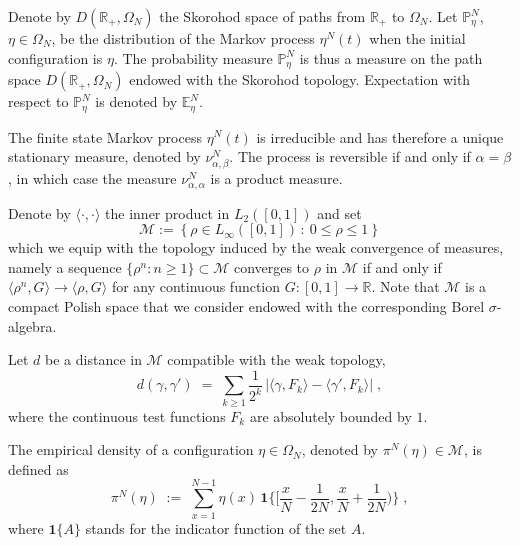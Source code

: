 \documentclass[reqno]{amsart}
\begin{document}
Denote by $D({{\mathbb R}}_+, \Omega_N)$ the Skorohod space of paths from ${{\mathbb R}}_+$ to $\Omega_N$.  Let ${{\mathbb P}}^N_\eta$, $\eta\in\Omega_N$, be the
distribution of the Markov process $\eta^N(t)$ when the initial
configuration is $\eta$. The probability measure ${{\mathbb P}}^N_\eta$ is
thus a measure on the path space $D({{\mathbb R}}_+, \Omega_N)$ endowed with
the Skorohod topology. Expectation with respect to ${{\mathbb P}}^N_\eta$ is
denoted by ${{\mathbb E}}^N_\eta$.

The finite state Markov process $\eta^N(t)$ is irreducible and has
therefore a unique stationary measure, denoted by $\nu^N_{\alpha,
  \beta}$. The process is reversible if and only if $\alpha=\beta$, in
which case the measure $\nu^N_{\alpha, \alpha}$ is a product measure.

 Denote by $\langle \cdot,\cdot
\rangle$ the inner product in $L_2 ([0,1])$ and set
\begin{equation*}
\label{dcm}
{{\mathscr M}} := \left\{ \rho \in L_\infty ([0,1]) \,:\:
0\leq \rho \leq 1 \right\}
\end{equation*}
which we equip with the topology induced by the weak convergence of
measures, namely a sequence $\{\rho^n : n\ge 1\} \subset {{\mathscr M}}$
converges to $\rho$ in ${{\mathscr M}}$ if and only if $\langle \rho^n, G
\rangle \to \langle \rho, G \rangle$ for any continuous function $G:
[0,1]\to{{\mathbb R}}$.  Note that ${{\mathscr M}}$ is a compact Polish space that we
consider endowed with the corresponding Borel $\sigma$-algebra.  

Let $d$ be a distance in ${{\mathscr M}}$ compatible with the weak topology,
\begin{equation}
\label{24}
d(\gamma,\gamma') \;=\; \sum_{k\ge 1} \frac 1{2^k} \, \big| {\langle} \gamma,
F_k{\rangle} - {\langle} \gamma', F_k{\rangle} \big|\;,
\end{equation}
where the continuous test functions $F_k$ are absolutely bounded by
$1$.

The empirical density of a configuration $\eta\in \Omega_N$, denoted
by $\pi^N(\eta) \in {{\mathscr M}}$, is defined as
\begin{equation*}
\label{eq:2}
\pi^N (\eta) \;:=\; \sum_{x=1}^{N-1} \eta (x) \,
{{\mathbf 1}} \big\{ 
{\textstyle \big[ \frac{x}{N}- \frac{1}{2N}, \frac{x}{N}
+ \frac{1}{2N}\big)} \big\}\; , 
\end{equation*}
where ${{\mathbf 1}}\{A\}$ stands for the indicator function of the set $A$.
\end{document}
